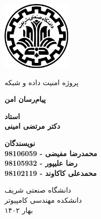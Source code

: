 \documentclass{article}
\begin{document}
\begin{titlepage}
	\begin{center}
		\vspace{0.2cm}
		
		\includegraphics[width=0.25\textwidth]{sharif.png}\\
		\vspace{0.2cm}
		
		\Large{پروژه امنیت داده و شبکه}\\
		\vspace{1.0cm}
		
		\textbf{ \Huge{پیام‌رسان امن}}\\
		\vspace{1.0cm}

		\textbf{ \Large{استاد}}\\
		\textbf{ \Large{دکتر مرتضی امینی}}\\
		\vspace{0.5cm}
		
		\textbf{\Large{نویسندگان}}\\
		\textbf{\Large{محمدرضا مفیضی - 98106059}}\\
		\textbf{\Large{رضا علیپور - 98105932}}\\
		\textbf{\Large{محمدعلی کاکاوند - 98102119}}\\
		\vspace{1.0cm}
		
		\large   دانشگاه صنعتی شریف\\\vspace{0.1cm}
		\large دانشکده مهندسی کامپیوتر\\\vspace{0.2cm}
		\large   بهار ۱۴۰۲ \\\vspace{0.1cm}
	\end{center}
\end{titlepage}

\newpage
\tableofcontents
\newpage
\pagestyle{fancy}
\fancyhf{}
\fancyfoot{}
\setlength{\headheight}{59pt}
\cfoot{\thepage}
\end{document}
